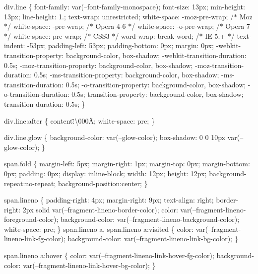div.\+line \{ font-\/family\+: var(--font-\/family-\/monospace); font-\/size\+: 13px; min-\/height\+: 13px; line-\/height\+: 1.; text-\/wrap\+: unrestricted; white-\/space\+: -\/moz-\/pre-\/wrap; /\texorpdfstring{$\ast$}{*} Moz \texorpdfstring{$\ast$}{*}/ white-\/space\+: -\/pre-\/wrap; /\texorpdfstring{$\ast$}{*} Opera 4-\/6 \texorpdfstring{$\ast$}{*}/ white-\/space\+: -\/o-\/pre-\/wrap; /\texorpdfstring{$\ast$}{*} Opera 7 \texorpdfstring{$\ast$}{*}/ white-\/space\+: pre-\/wrap; /\texorpdfstring{$\ast$}{*} CSS3 \texorpdfstring{$\ast$}{*}/ word-\/wrap\+: break-\/word; /\texorpdfstring{$\ast$}{*} IE 5.+ \texorpdfstring{$\ast$}{*}/ text-\/indent\+: -\/53px; padding-\/left\+: 53px; padding-\/bottom\+: 0px; margin\+: 0px; -\/webkit-\/transition-\/property\+: background-\/color, box-\/shadow; -\/webkit-\/transition-\/duration\+: 0.\+5s; -\/moz-\/transition-\/property\+: background-\/color, box-\/shadow; -\/moz-\/transition-\/duration\+: 0.\+5s; -\/ms-\/transition-\/property\+: background-\/color, box-\/shadow; -\/ms-\/transition-\/duration\+: 0.\+5s; -\/o-\/transition-\/property\+: background-\/color, box-\/shadow; -\/o-\/transition-\/duration\+: 0.\+5s; transition-\/property\+: background-\/color, box-\/shadow; transition-\/duration\+: 0.\+5s; \}

div.\+line\+:after \{ content\+:\"{}\textbackslash{}000\+A\"{}; white-\/space\+: pre; \}

div.\+line.\+glow \{ background-\/color\+: var(--glow-\/color); box-\/shadow\+: 0 0 10px var(--glow-\/color); \}

span.\+fold \{ margin-\/left\+: 5px; margin-\/right\+: 1px; margin-\/top\+: 0px; margin-\/bottom\+: 0px; padding\+: 0px; display\+: inline-\/block; width\+: 12px; height\+: 12px; background-\/repeat\+:no-\/repeat; background-\/position\+:center; \}

span.\+lineno \{ padding-\/right\+: 4px; margin-\/right\+: 9px; text-\/align\+: right; border-\/right\+: 2px solid var(--fragment-\/lineno-\/border-\/color); color\+: var(--fragment-\/lineno-\/foreground-\/color); background-\/color\+: var(--fragment-\/lineno-\/background-\/color); white-\/space\+: pre; \} span.\+lineno a, span.\+lineno a\+:visited \{ color\+: var(--fragment-\/lineno-\/link-\/fg-\/color); background-\/color\+: var(--fragment-\/lineno-\/link-\/bg-\/color); \}

span.\+lineno a\+:hover \{ color\+: var(--fragment-\/lineno-\/link-\/hover-\/fg-\/color); background-\/color\+: var(--fragment-\/lineno-\/link-\/hover-\/bg-\/color); \}

